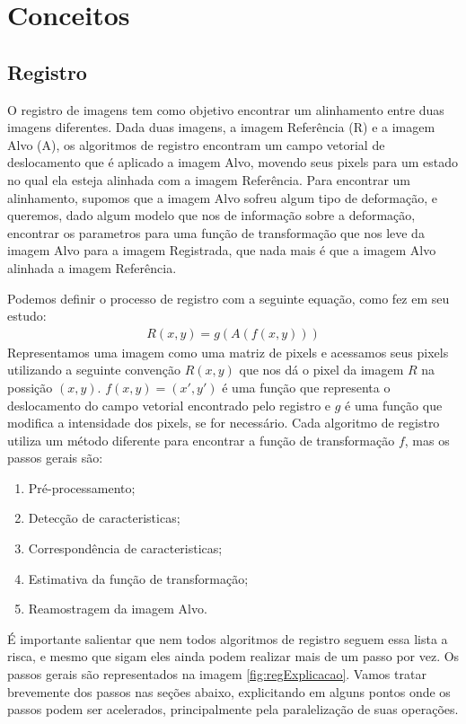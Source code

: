 \chapter{Conceitos}
\label{cap:conceitos}

\section{Registro}
\label{sec:fundamentos}

    O registro de imagens tem como objetivo encontrar um alinhamento entre duas imagens diferentes. Dada duas imagens, 
a imagem Referência (R) e a imagem Alvo (A), os algoritmos de registro encontram um campo
vetorial de deslocamento que é aplicado a imagem Alvo, movendo seus pixels para um estado no qual ela esteja alinhada
com a imagem Referência. Para encontrar um alinhamento, supomos que a imagem Alvo sofreu algum tipo de deformação,
e queremos, dado algum modelo que nos de informação sobre a deformação, encontrar os parametros para uma função de
transformação que nos leve da imagem Alvo para a imagem Registrada, que nada mais é que a imagem Alvo alinhada a imagem
Referência.

Podemos definir o processo de registro com a seguinte equação, como \cite{brown1992survey} fez em seu estudo:
\begin{align}\label{eq:defregistro}
    R(x,y) = g(A(f(x,y)))
\end{align}
    Representamos uma imagem como uma matriz de pixels e acessamos seus pixels utilizando a seguinte convenção $R(x,y)$ 
que nos dá o pixel da imagem $R$ na possição $(x,y)$. $f(x,y) = (x',y')$ é uma função que representa o deslocamento do 
campo vetorial encontrado pelo registro e $g$ é uma função que modifica a intensidade dos pixels, se for necessário. 
Cada algoritmo de registro utiliza um método diferente para encontrar a função de transformação $f$, mas os passos gerais são:
\begin{enumerate}
    \item Pré-processamento;
    \item Detecção de caracteristicas;
    \item Correspondência de caracteristicas;
    \item Estimativa da função de transformação;
    \item Reamostragem da imagem Alvo.
\end{enumerate}
    É importante salientar que nem todos algoritmos de registro seguem essa lista a risca, e mesmo que sigam eles ainda
podem realizar mais de um passo por vez. Os passos gerais são representados na imagem \ref{fig:regExplicacao}. 
Vamos tratar brevemente dos passos nas seções abaixo, explicitando em alguns pontos onde os passos podem ser acelerados,
principalmente pela paralelização de suas operações.

